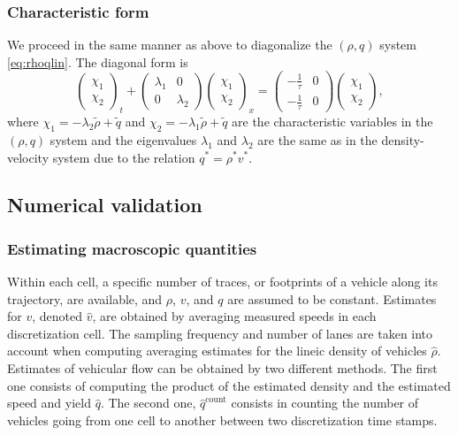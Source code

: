 \documentclass[a4paper, 10pt, conference]{ieeeconf}      %
\begin{document}
\subsubsection{Characteristic form}
We proceed in the same manner as above to diagonalize the $(\rho,q)$ system \eqref{eq:rhoqlin}. The diagonal form is
{\footnotesize
\begin{equation} \label{rhoqlindiag}
\begin{pmatrix}
	\chi_1 \\ 
	\chi_2
\end{pmatrix}_t 
+
\begin{pmatrix}
	\lambda_1 & 0 \\
	0 & \lambda_2
\end{pmatrix}
\begin{pmatrix}
	\chi_1 \\ 
	\chi_2
\end{pmatrix}_x
= 
\begin{pmatrix}
	-\frac{1}{\tau} & 0 \\
	-\frac{1}{\tau} & 0
\end{pmatrix}
\begin{pmatrix}
\chi_1 \\ \chi_2
\end{pmatrix},
\end{equation}
}
where $\chi_1 = -\lambda_2 \tilde{\rho} + \tilde{q}$ and $\chi_2 = -\lambda_1 \tilde{\rho} + \tilde{q}$ are the characteristic variables in the $(\rho,q)$ system and the eigenvalues $\lambda_1$ and $\lambda_2$ are the same as in the density-velocity system due to the relation $q^* = \rho^*v^*$.


\subsection{Numerical validation}

\subsubsection{Estimating macroscopic quantities}
Within each cell, a specific number of traces, or footprints of a vehicle along its trajectory, are available, and $\rho$, $v$, and $q$ are assumed to be constant. Estimates for $v$, denoted $\hat{v}$, are obtained by averaging measured speeds in each discretization cell. The sampling frequency and number of lanes are taken into account when computing averaging estimates for the lineic density of vehicles $\hat{\rho}$. Estimates of vehicular flow can be obtained by two different methods. The first one consists of computing the product of the estimated density and the estimated speed and yield $\hat{q}$. The second one, $\hat{q}^{\text{count}}$ consists in counting the number of vehicles going from one cell to another between two discretization time stamps.
\end{document}
